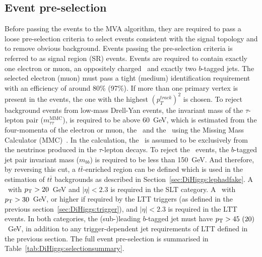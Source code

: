 \subsection{Event pre-selection}

\label{sec:DiHiggs:selection}



Before passing the events to the MVA algorithm, 
they are required to pass a loose pre-selection criteria to 
select events consistent with the signal topology and to
remove obvious background.  
Events passing the pre-selection criteria is referred to as
signal region (SR) events. 
Events are required to contain exactly 
one electron or muon, 
an oppositely charged \tauhad\, 
and exactly two $b$-tagged jets.
The selected electron (muon) must pass a 
tight (medium) identification requirement with an efficiency of around 80\% (97\%).
If more than one primary vertex is present in the events, 
the one with the highest $(p_T^{track})^2$ is chosen.
To reject background events from low-mass Drell-Yan events, 
the invariant mass of the $\tau$-lepton pair ($m_{\tau\tau}^\text{MMC}$),
is required to be above 60~GeV,
which is estimated from the four-momenta of the electron or muon, 
the \tauhad\ and the \met\ using the Missing Mass Calculator (MMC)~\cite{Elagin:2010aw}.
In the calculation, the \met\ is assumed to be exclusively from the neutrinos 
produced in the $\tau$-lepton decays. 
To reject the \ttbar\ events, the $b$-tagged jet pair invariant mass ($m_{bb}$) 
is required to be less than 150~GeV. And therefore, by reversing this cut, 
a $t\bar t$-enriched region can be defined  
which is used in the estimation of $t\bar t$ backgrounds
as described in Section~\ref{sec:DiHiggs:lephadfake}. 
A \tauhad\ with $p_{\mathrm T}>20$~GeV and 
$\vert\eta\vert<2.3$ is required in the SLT category.
A \tauhad\ with $p_{\mathrm T}>30$~GeV,
or higher if required by the LTT triggers (as defined in the previous
section~\ref{sec:DiHiggs:trigger}), 
and $\vert\eta\vert<2.3$ is required in the LTT events. 
In both categories, the (sub-)leading $b$-tagged jet 
must have $p_{\mathrm T}>45~(20)$~GeV, 
in addition to any trigger-dependent jet requirements of LTT
defined in the previous section.
The full event pre-selection is summarised in Table~\ref{tab:DiHiggs:selectionsummary}. 

